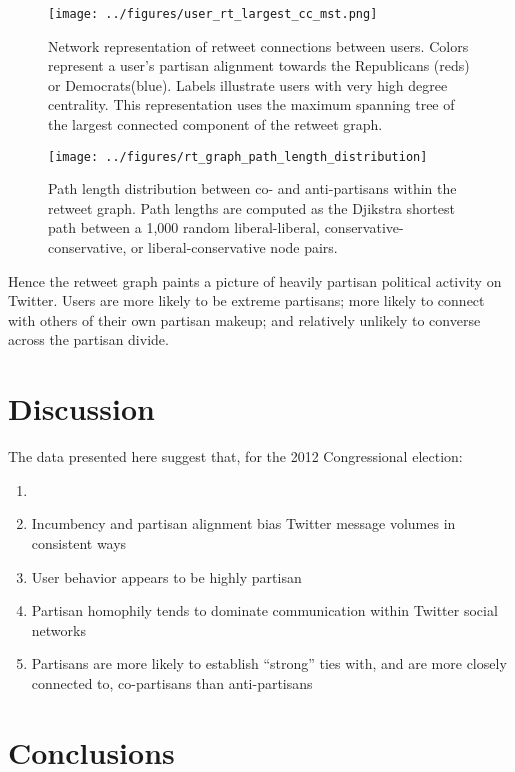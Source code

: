 \documentclass[11pt]{article}
\begin{document}
\begin{figure}[ht]
  \centering
  \texttt{[image: ../figures/user\_rt\_largest\_cc\_mst.png]}
  \caption{Network representation of retweet connections between
    users. Colors represent a user's partisan alignment towards the
    Republicans (reds) or Democrats(blue). Labels illustrate users with
    very high degree centrality. This representation uses the maximum
    spanning tree of the largest connected component of the retweet graph.}
  \label{fig:largest-cc-mst}
\end{figure}

\begin{figure}[ht]
  \centering
  \texttt{[image: ../figures/rt\_graph\_path\_length\_distribution]}
  \caption{Path length distribution between co- and anti-partisans within the retweet graph. Path lengths are computed as the Djikstra shortest path between a 1,000 random liberal-liberal, conservative-conservative, or liberal-conservative node pairs. }
  \label{fig:rt-partisan-path-length}
\end{figure}

Hence the retweet graph paints a picture of heavily partisan political activity
on Twitter. Users are more likely to be extreme partisans; more likely
to connect with others of their own partisan makeup; and relatively
unlikely to converse across the partisan divide. 


\section{Discussion}
\label{sec:discussion}

The data presented here suggest that, for the 2012 Congressional election:

\begin{enumerate}
\item 
\item Incumbency and partisan alignment bias Twitter message volumes
  in consistent ways
\item User behavior appears to be highly partisan
\item Partisan homophily tends to dominate communication within
  Twitter social networks
\item  Partisans are more likely to establish ``strong'' ties with,
  and are more closely connected to,
  co-partisans than anti-partisans
\end{enumerate}



\section{Conclusions}
\label{sec:conclusions}
\end{document}
